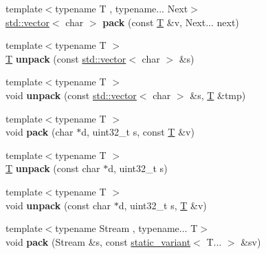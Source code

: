 \begin{DoxyCompactItemize}
\item 
\mbox{\label{namespacefc_1_1raw_a2777222c15b5b035fcc174bfc227a0ac}} 
{\footnotesize template$<$typename T , typename... Next$>$ }\\\mbox{\hyperlink{classstd_1_1vector}{std\+::vector}}$<$ char $>$ {\bfseries pack} (const \mbox{\hyperlink{struct_t}{T}} \&v, Next... next)
\item 
\mbox{\label{namespacefc_1_1raw_aa7242573b01600ab440fd437e37c091b}} 
{\footnotesize template$<$typename T $>$ }\\\mbox{\hyperlink{struct_t}{T}} {\bfseries unpack} (const \mbox{\hyperlink{classstd_1_1vector}{std\+::vector}}$<$ char $>$ \&s)
\item 
\mbox{\label{namespacefc_1_1raw_a9d71f3c35bccbe080792839821d7418c}} 
{\footnotesize template$<$typename T $>$ }\\void {\bfseries unpack} (const \mbox{\hyperlink{classstd_1_1vector}{std\+::vector}}$<$ char $>$ \&s, \mbox{\hyperlink{struct_t}{T}} \&tmp)
\item 
\mbox{\label{namespacefc_1_1raw_a8fe6edffd6ddf8900a835cb0fafb61a3}} 
{\footnotesize template$<$typename T $>$ }\\void {\bfseries pack} (char $\ast$d, uint32\+\_\+t s, const \mbox{\hyperlink{struct_t}{T}} \&v)
\item 
\mbox{\label{namespacefc_1_1raw_a9fae02a9ccf1d398bcf3cf11a548475a}} 
{\footnotesize template$<$typename T $>$ }\\\mbox{\hyperlink{struct_t}{T}} {\bfseries unpack} (const char $\ast$d, uint32\+\_\+t s)
\item 
\mbox{\label{namespacefc_1_1raw_ab7250a68159efdc9ca209d51ab4ea3c0}} 
{\footnotesize template$<$typename T $>$ }\\void {\bfseries unpack} (const char $\ast$d, uint32\+\_\+t s, \mbox{\hyperlink{struct_t}{T}} \&v)
\item 
\mbox{\label{namespacefc_1_1raw_a0aa3c57aade5fb0789ea503c94cb448a}} 
{\footnotesize template$<$typename Stream , typename... T$>$ }\\void {\bfseries pack} (Stream \&s, const \mbox{\hyperlink{classfc_1_1static__variant}{static\+\_\+variant}}$<$ T... $>$ \&sv)

\end{DoxyCompactItemize}
